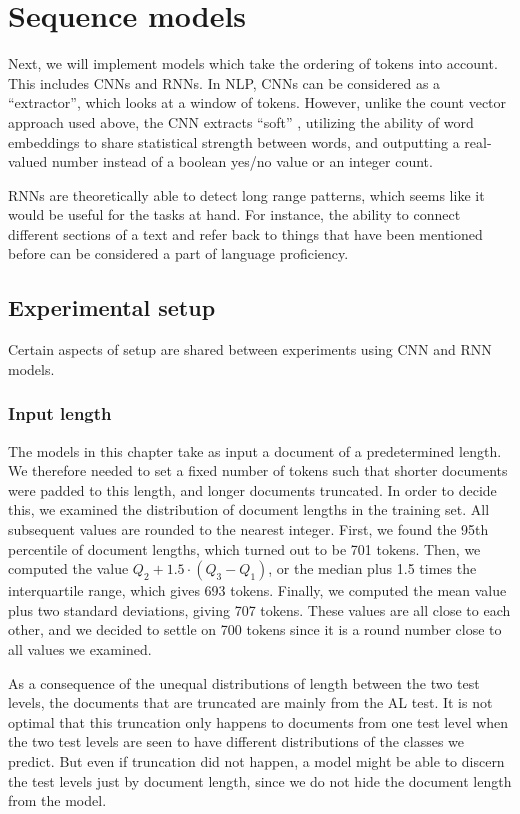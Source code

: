 \chapter{Sequence models}

Next, we will implement models which take the ordering of tokens into
account. This includes \acp{CNN} and \acp{RNN}. In \ac{NLP}, \acp{CNN} can be
considered as a ``\ngram extractor'', which looks at a window of tokens.
However, unlike the count vector approach used above, the CNN extracts
``soft'' \ngrams, utilizing the ability of word embeddings to share
statistical strength between words, and outputting a real-valued number
instead of a boolean yes/no value or an integer count.

\acp{RNN} are theoretically able to detect long range patterns, which seems
like it would be useful for the tasks at hand. For instance, the ability to
connect different sections of a text and refer back to things that have been
mentioned before can be considered a part of language proficiency.


\section{Experimental setup}

Certain aspects of setup are shared between experiments using \ac{CNN} and
\ac{RNN} models.


\subsection{Input length}

The models in this chapter take as input a document of a predetermined
length. We therefore needed to set a fixed number of tokens such that shorter
documents were padded to this length, and longer documents truncated. In
order to decide this, we examined the distribution of document lengths in the
training set. All subsequent values are rounded to the nearest integer.
First, we found the 95th percentile of document lengths, which turned out to
be 701 tokens. Then, we computed the value $Q_2 + 1.5 \cdot (Q_3 - Q_1)$, or
the median plus 1.5 times the interquartile range, which gives 693 tokens.
Finally, we computed the mean value plus two standard deviations, giving 707
tokens. These values are all close to each other, and we decided to settle on
700 tokens since it is a round number close to all values we examined.

As a consequence of the unequal distributions of length between the two test
levels, the documents that are truncated are mainly from the AL test. It is
not optimal that this truncation only happens to documents from one test
level when the two test levels are seen to have different distributions of
the classes we predict. But even if truncation did not happen, a model might
be able to discern the test levels just by document length, since we do not
hide the document length from the model. 


